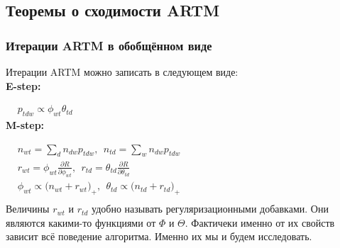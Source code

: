 \documentclass[12pt]{article}
\begin{document}
	\subsection{Теоремы о сходимости ARTM }
	\subsubsection{Итерации ARTM в обобщённом виде}	  
Итерации ARTM можно записать в следующем виде: \\
\textbf{E-step:}   
 
$
\begin{aligned}
& p_{tdw} \propto \phi_{wt} \theta_{td}
\end{aligned}
$\medskip\\
\textbf{M-step:}

$
\begin{aligned}    
& n_{wt} = \sum\limits_{d} n_{dw} p_{tdw},~~n_{td} = \sum\limits_{w} n_{dw} p_{tdw}\\    
& r_{wt} =  \phi_{wt}\frac{\partial R}{\partial\phi_{wt}},~~ r_{td} =  \theta_{td}\frac{\partial R}{\partial\theta_{td}}\\
& \phi_{wt}  \propto \bigl(n_{wt} + r_{wt} \bigr)_{+},~~\theta_{td} \propto  \bigl(n_{td} + r_{td}\bigr)_{+}\\
\end{aligned}
$\medskip\\
Величины $r_{wt}$ и $r_{td}$ удобно называть регуляризационными добавками. Они являются какими-то функциями от $\Phi$ и $\Theta$. Фактичеки именно от их свойств зависит всё поведение алгоритма. Именно их мы и будем исследовать.
\end{document}
